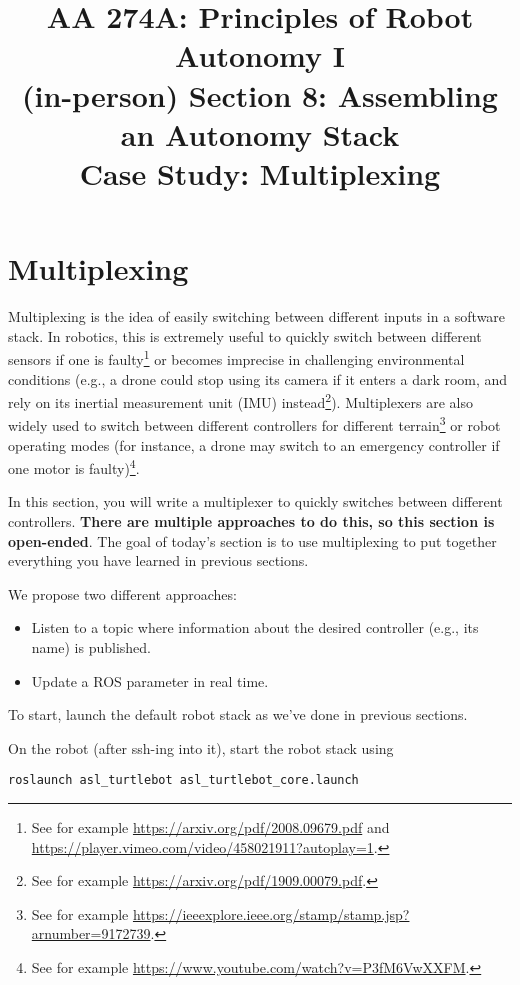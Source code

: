 \documentclass{article}
\title{AA 274A: Principles of Robot Autonomy I \\ (in-person) Section 8: Assembling an Autonomy Stack\\
Case Study: Multiplexing}
\date{}
\begin{document}
\maketitle
\pagestyle{fancy}




\section{Multiplexing}
Multiplexing is the idea of easily switching between different inputs in a software stack. In robotics, this is extremely useful to quickly switch between different sensors if one is faulty\footnote{See for example \url{https://arxiv.org/pdf/2008.09679.pdf} and \url{https://player.vimeo.com/video/458021911?autoplay=1}.} or becomes imprecise in challenging environmental conditions (e.g., a drone could stop using its  camera if it enters a dark room, and rely on its inertial measurement unit (IMU) instead\footnote{See for example \url{https://arxiv.org/pdf/1909.00079.pdf}.}). Multiplexers are also widely used to switch between different controllers for different terrain\footnote{See for example \url{https://ieeexplore.ieee.org/stamp/stamp.jsp?arnumber=9172739}.} or robot operating modes (for instance, a drone may switch to an emergency controller if one motor is faulty)\footnote{See for example \url{https://www.youtube.com/watch?v=P3fM6VwXXFM}.}.

In this section, you will write a multiplexer to quickly switches between different controllers. \textbf{There are multiple approaches to do this, so this section is open-ended}. 
The goal of today's section is to use multiplexing to put together everything you have learned in previous sections.

We propose two different approaches:
\begin{itemize}
    \item Listen to a topic where information about the desired controller (e.g., its name) is published.
    \item Update a ROS parameter in real time.
\end{itemize}

To start, launch the default robot stack as we've done in previous sections.

On the robot (after ssh-ing into it), start the robot stack using
\begin{lstlisting}
roslaunch asl_turtlebot asl_turtlebot_core.launch
\end{lstlisting}
\end{document}
